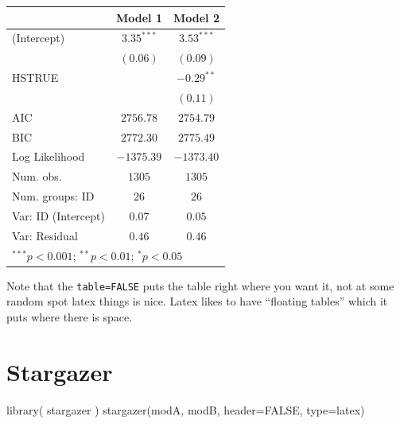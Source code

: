 \documentclass[
  letterpaper,
  DIV=11,
  numbers=noendperiod]{scrreprt}
\newenvironment{Shaded}{\begin{snugshade}}{\end{snugshade}}
\newcommand{\AttributeTok}[1]{\textcolor[rgb]{0.49,0.56,0.16}{#1}}
\newcommand{\ConstantTok}[1]{\textcolor[rgb]{0.53,0.00,0.00}{#1}}
\newcommand{\FunctionTok}[1]{\textcolor[rgb]{0.02,0.16,0.49}{#1}}
\newcommand{\NormalTok}[1]{\textcolor[rgb]{0.00,0.44,0.13}{#1}}
\newcommand{\StringTok}[1]{\textcolor[rgb]{0.25,0.44,0.63}{#1}}
\begin{document}
\begin{tabular}{l c c}
\hline
 & Model 1 & Model 2 \\
\hline
(Intercept)         & $3.35^{***}$ & $3.53^{***}$ \\
                    & $(0.06)$     & $(0.09)$     \\
HSTRUE              &              & $-0.29^{**}$ \\
                    &              & $(0.11)$     \\
\hline
AIC                 & $2756.78$    & $2754.79$    \\
BIC                 & $2772.30$    & $2775.49$    \\
Log Likelihood      & $-1375.39$   & $-1373.40$   \\
Num. obs.           & $1305$       & $1305$       \\
Num. groups: ID     & $26$         & $26$         \\
Var: ID (Intercept) & $0.07$       & $0.05$       \\
Var: Residual       & $0.46$       & $0.46$       \\
\hline
\multicolumn{3}{l}{\scriptsize{$^{***}p<0.001$; $^{**}p<0.01$; $^{*}p<0.05$}}
\end{tabular}

Note that the \texttt{table=FALSE} puts the table right where you want
it, not at some random spot latex things is nice. Latex likes to have
``floating tables'' which it puts where there is space.

\hypertarget{stargazer}{%
\section{Stargazer}\label{stargazer}}

\begin{Shaded}
\begin{Highlighting}[]
\FunctionTok{library}\NormalTok{( stargazer )}
\FunctionTok{stargazer}\NormalTok{(modA, modB, }\AttributeTok{header=}\ConstantTok{FALSE}\NormalTok{, }\AttributeTok{type=}\StringTok{\textquotesingle{}latex\textquotesingle{}}\NormalTok{)}
\end{Highlighting}
\end{Shaded}
\end{document}
